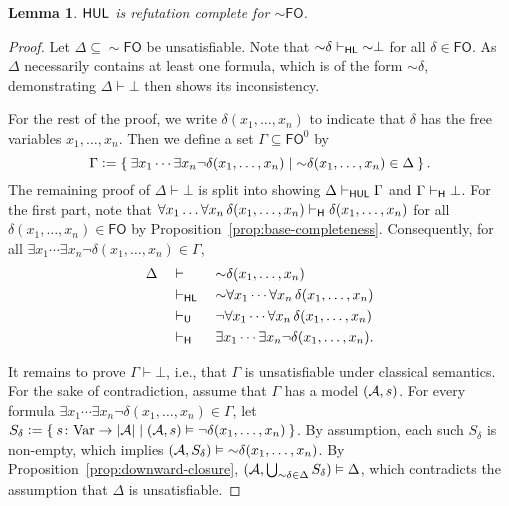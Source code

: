 \documentclass[a4paper,english,fleqn,11pt,final]{scrartcl}
\makeatletter
\newcommand{\ie}{i.e.\@\xspace}
\newcommand{\size}[1]{{\protect\ensuremath{\vert\nobreak#1\nobreak\vert}}}
\newcommand{\negg}{{\sim}}
\newcommand{\logic}[1]{\ensuremath{\mathsf{#1}}\xspace}
\newcommand{\FO}{\logic{FO}}
\newcommand{\Var}{\mathrm{Var}}
\newcommand{\calA}{\protect\ensuremath{\mathcal{A}}}
\newcommand{\sfH}{\protect\ensuremath{\mathsf{H}}}
\newcommand{\sfL}{\protect\ensuremath{\mathsf{L}}}
\newcommand{\sfU}{\protect\ensuremath{\mathsf{U}}}
\providecommand{\dfn}{\mathrel{\mathop:}=}
\theoremstyle{plain}
\newtheorem{lemma}[theorem]{Lemma}
\theoremstyle{definition}
\makeatother
\begin{document}
\begin{lemma}\label{lem:negg-fo-completeness}
$\sfH\sfU\sfL$ is refutation complete for $\negg\FO$.
\end{lemma}
\begin{proof}
Let $\Delta \subseteq \negg\FO$ be unsatisfiable.
Note that $\negg\delta \vdash_{\sfH\sfL} \negg \bot$ for all $\delta \in \FO$.
As $\Delta$ necessarily contains at least one formula, which is of the form $\negg\delta$, demonstrating $\Delta \vdash \bot$ then shows its inconsistency.

For the rest of the proof, we write $\delta(x_1, \ldots, x_n)$ to indicate that $\delta$ has the free variables $x_1, \ldots, x_n$.
Then we define a set $\Gamma \subseteq \FO^0$ by
\[
\Gamma \dfn \Set{\exists x_1 \cdots \exists x_n \neg\delta(x_1,\ldots,x_n) | \negg\delta(x_1,\ldots,x_n) \in \Delta}\text{.}
\]
The remaining proof of $\Delta \vdash \bot$ is split into showing $\Delta \vdash_{\sfH\sfU\sfL} \Gamma$ and $\Gamma \vdash_{\sfH} \bot$.
For the first part, note that $\forall x_1\ldots\forall x_n\, \delta(x_1,\ldots,x_n) \vdash_\sfH \delta(x_1,\ldots,x_n)$ for all $\delta(x_1,\ldots,x_n) \in \FO$ by Proposition~\ref{prop:base-completeness}.
Consequently, for all $\exists x_1 \cdots \exists x_n \neg\delta(x_1, \ldots, x_n) \in \Gamma$,
\begin{alignat*}{3}
 &	\Delta && \vdash &&\;\negg\delta(x_1,\ldots,x_n)\\
 &	&& \vdash_{\sfH\sfL} &&\;\negg \forall x_1\cdots \forall x_n\, \delta(x_1,\ldots,x_n)\\
&	 && \vdash_\sfU &&\;\neg \forall x_1 \cdots \forall x_n\, \delta(x_1,\ldots,x_n)\\
& && \vdash_\sfH &&\; \exists x_1 \cdots \exists x_n \neg\delta(x_1, \ldots, x_n)\text{.}
\end{alignat*}

It remains to prove $\Gamma \vdash \bot$, \ie, that $\Gamma$ is unsatisfiable under classical semantics.
For the sake of contradiction, assume that $\Gamma$ has a model $(\calA,s)$.
For every formula $\exists x_1 \cdots \exists x_n \neg\delta(x_1,\ldots,x_n) \in \Gamma$, let $S_\delta \dfn \Set{ s \colon \Var \to \size{\calA} | (\calA, s) \vDash \neg\delta(x_1,\ldots,x_n)}$.
By assumption, each such $S_\delta$ is non-empty, which implies $(\calA, S_\delta) \vDash \negg \delta(x_1,\ldots,x_n)$.
By Proposition~\ref{prop:downward-closure}, $(\calA,\bigcup_{\negg\delta \in \Delta}S_\delta) \vDash \Delta$, which contradicts the assumption that $\Delta$ is unsatisfiable.
\end{proof}
\end{document}
